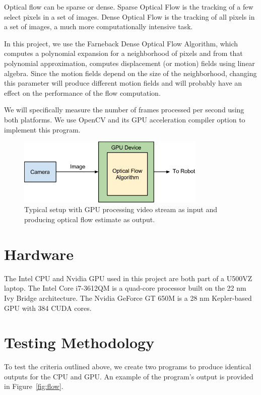 \documentclass[12pt,letterpaper]{article}
\begin{document}
Optical flow can be sparse or dense. Sparse Optical Flow is the tracking of
a few select pixels in a set of images. Dense Optical Flow is the tracking of
all pixels in a set of images, a much more computationally intensive task.

In this project, we use the Farneback Dense Optical Flow Algorithm, which
computes a polynomial expansion for a neighborhood of pixels and from that
polynomial approximation, computes displacement (or motion) fields using linear
algebra. Since the motion fields depend on the size of the neighborhood,
changing this parameter will produce different motion fields and will probably
have an effect on the performance of the flow computation.

We will specifically measure the number of frames processed per second using
both platforms. We use OpenCV and its GPU acceleration compiler option to
implement this program.

\begin{figure}[H]
  \centering
  \includegraphics[width=0.8\textwidth]{img/sys.png}
  \caption{Typical setup with GPU processing video stream as input and producing optical flow estimate as output.}
  \label{fig:sys}
\end{figure}

\section{Hardware}
The Intel CPU and Nvidia GPU used in this project are both part of a U500VZ
laptop. The Intel Core i7-3612QM is a quad-core processor built on the 22 nm
Ivy Bridge architecture. The Nvidia GeForce GT 650M is a 28 nm Kepler-based GPU
with 384 CUDA cores.

\section{Testing Methodology}
To test the criteria outlined above, we create two programs to produce
identical outputs for the CPU and GPU. An example of the program's output is
provided in Figure~\ref{fig:flow}.
\end{document}
